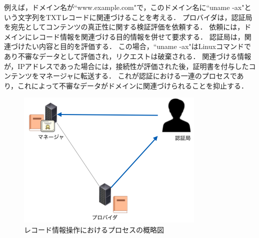 例えば，ドメイン名が``www.example.com"で，このドメイン名に``uname -ax"という文字列をTXTレコードに関連づけることを考える．
プロバイダは，認証局を宛先としてコンテンツの真正性に関する検証評価を依頼する．
依頼には，ドメインにレコード情報を関連づける目的情報を併せて要求する．
認証局は，関連づけたい内容と目的を評価する．
この場合，``uname -ax"はLinuxコマンドであり不審なデータとして評価され，リクエストは破棄される．
関連づける情報が，IPアドレスであった場合には，接続性が評価された後，証明書を付与したコンテンツをマネージャに転送する．
これが認証における一連のプロセスであり，これによって不審なデータがドメインに関連づけられることを抑止する．
\begin{figure}[h]
 \centering
 \includegraphics[scale=0.3]{figure/certificate-procedure.png}
 \caption{レコード情報操作におけるプロセスの概略図}
 \label{fig:manager-provider}
\end{figure}
